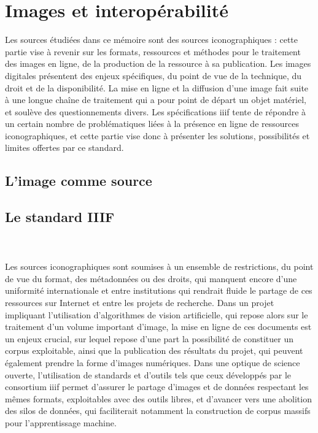 \documentclass[a4paper,12pt,twoside]{book}
\newcommand{\iiif}{\gls{iiif}\xspace}
\newcommand{\clearemptydoublepage}{\newpage{\pagestyle{empty}\cleardoublepage}}
\begin{document}
        \chapter{Images et interopérabilité}
        Les sources étudiées dans ce mémoire sont des sources iconographiques : cette partie vise à revenir sur les formats, ressources et méthodes pour le traitement des images en ligne, de la production de la ressource à sa publication. Les images digitales présentent des enjeux spécifiques, du point de vue de la technique, du droit et de la disponibilité. La mise en ligne et la diffusion d'une image fait suite à une longue chaîne de traitement qui a pour point de départ un objet matériel, et soulève des questionnements divers. Les spécifications \iiif tente de répondre à un certain nombre de problématiques liées à la présence en ligne de ressources iconographiques, et cette partie vise donc à présenter les solutions, possibilités et limites offertes par ce standard.
        
                \section{L’image comme source}
                    
            
                \section{Le standard IIIF}
                    
        \\
        \\
        Les sources iconographiques sont soumises à un ensemble de restrictions, du point de vue du format, des métadonnées ou des droits, qui manquent encore d'une uniformité internationale et entre institutions qui rendrait fluide le partage de ces ressources sur Internet et entre les projets de recherche. Dans un projet impliquant l'utilisation d'algorithmes de vision artificielle, qui repose alors sur le traitement d'un volume important d'image, la mise en ligne de ces documents est un enjeux crucial, sur lequel repose d'une part la possibilité de constituer un corpus exploitable, ainsi que la publication des résultats du projet, qui peuvent également prendre la forme d'images numériques. Dans une optique de science ouverte, l'utilisation de standards et d'outils tels que ceux développés par le consortium \iiif permet d'assurer le partage d'images et de données respectant les mêmes formats, exploitables avec des outils libres, et d'avancer vers une abolition des silos de données, qui faciliterait notamment la construction de corpus massifs pour l'apprentissage machine. 
        \clearemptydoublepage
        
\end{document}
